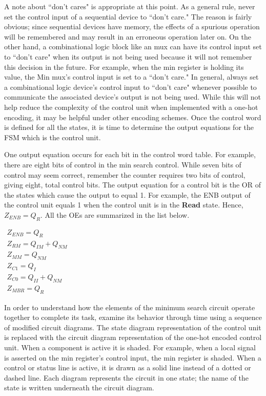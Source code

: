 A note about ``don't cares" is appropriate at this point.  As a general
rule, never set the control input of a sequential device to
``don't care."  The reason is fairly obvious; since sequential devices
have memory, the effects of a spurious operation will be remembered
and may result in an erroneous operation later on.  On the other hand, a
combinational logic block like an mux can have its control input set
to ``don't care" when its output is not being used because it will not
remember this decision in the future.  For example, when the min
register is holding its value, the Min mux's control input is set
to a ``don't care."  In general,  always set a combinational
logic device's control input to ``don't care" whenever possible to
communicate the associated device's output is not being used.  While
this will not help reduce the complexity of the control unit when
implemented with a one-hot encoding, it may be helpful under
other encoding schemes.  Once the control word is defined for all the
states, it is time to determine the output equations for the FSM which
is the control unit.

One output equation occurs for each bit in the control word table.
For example, there are eight bits of control in the min search control.
While seven bits of control may seem correct, remember
the counter requires two bits of control, giving
eight, total control bits.  The output equation for a control bit is the
OR of the states which cause the output to equal 1.  For example, the
ENB output of the control unit equals 1 when the control unit is in the
\textbf{ Read} state. Hence, $Z_{ENB} = Q_{R}$.
All the OEs are summarized in the list below.

$
\begin{array}{l}
    Z_{ENB} = Q_{R} \\
    Z_{RM} = Q_{IM}  + Q_{NM} \\
    Z_{MM} = Q_{NM} \\
    Z_{C1} = Q_{I} \\
    Z_{C0} = Q_{II} + Q_{NM} \\
    Z_{MBR} = Q_{R}
\end{array}$

In order to understand how the elements of the minimum search circuit
operate together to complete its task, examine its
behavior through time using a sequence of modified circuit
diagrams.  The state diagram representation of
the control unit is replaced with the circuit diagram
representation of the one-hot encoded control unit.  When a
component is active it is shaded.  For example,
when a local signal is asserted on the min register's control
input, the min register is shaded. When a control
or status line is active, it is drawn as a solid line instead
of a dotted or dashed line.  Each diagram represents the
circuit in one state; the name of the state is written
underneath the circuit diagram.

